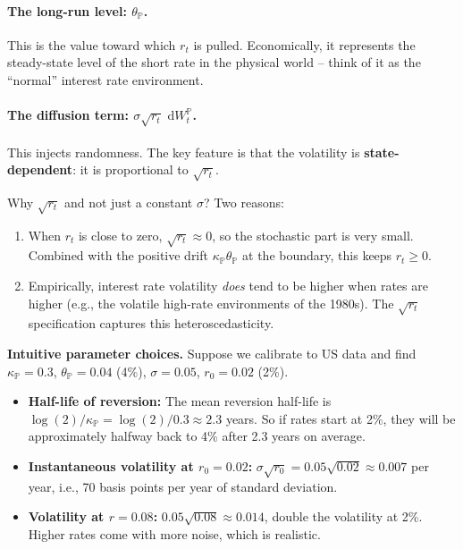 \documentclass[11pt]{article}
\newcommand{\PP}{\mathbb{P}}
\newcommand{\dd}{\,\mathrm{d}}
\begin{document}
\paragraph{The long-run level: $\theta_\PP$.}
This is the value toward which $r_t$ is pulled.  Economically, it
represents the steady-state level of the short rate in the physical world --
think of it as the ``normal'' interest rate environment.

\paragraph{The diffusion term: $\sigma\sqrt{r_t}\,\dd W_t^\PP$.}
This injects randomness.  The key feature is that the volatility is
\textbf{state-dependent}: it is proportional to $\sqrt{r_t}$.

Why $\sqrt{r_t}$ and not just a constant $\sigma$?  Two reasons:
\begin{enumerate}
  \item When $r_t$ is close to zero, $\sqrt{r_t} \approx 0$, so the
  stochastic part is very small.  Combined with the positive drift
  $\kappa_\PP\theta_\PP$ at the boundary, this keeps $r_t \ge 0$.
  \item Empirically, interest rate volatility \emph{does} tend to be higher
  when rates are higher (e.g., the volatile high-rate environments of the
  1980s).  The $\sqrt{r_t}$ specification captures this heteroscedasticity.
\end{enumerate}

\begin{example_box}
\textbf{Intuitive parameter choices.}  Suppose we calibrate to US data and
find $\kappa_\PP = 0.3$, $\theta_\PP = 0.04$ (4\%), $\sigma = 0.05$,
$r_0 = 0.02$ (2\%).

\begin{itemize}
  \item \textbf{Half-life of reversion:} The mean reversion half-life is
  $\log(2)/\kappa_\PP = \log(2)/0.3 \approx 2.3$ years.  So if rates start
  at 2\%, they will be approximately halfway back to 4\% after 2.3 years on
  average.
  \item \textbf{Instantaneous volatility at $r_0=0.02$:}
  $\sigma\sqrt{r_0} = 0.05\sqrt{0.02} \approx 0.007$ per year, i.e., 70
  basis points per year of standard deviation.
  \item \textbf{Volatility at $r=0.08$:}
  $0.05\sqrt{0.08} \approx 0.014$, double the volatility at 2\%.  Higher
  rates come with more noise, which is realistic.
\end{itemize}
\end{example_box}
\end{document}
